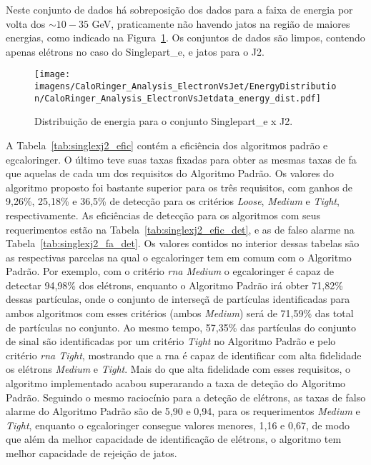 Neste conjunto de dados há sobreposição dos dados para a faixa de energia por
volta dos $\sim10-35$ GeV, praticamente não havendo jatos na região de maiores
energias, como indicado na Figura~\ref{fig:singlexj2_distenergia}. Os conjuntos de
dados são limpos, contendo apenas elétrons no caso do Singlepart\_e, e jatos
para o J2.

\begin{figure}[ht]
\centering
\texttt{[image: imagens/CaloRinger\_Analysis\_ElectronVsJet/EnergyDistribution/CaloRinger\_Analysis\_ElectronVsJetdata\_energy\_dist.pdf]}
\label{fig:singlexj2_distenergia}
\caption{Distribuição de energia para o conjunto Singlepart\_e x J2.}
\end{figure}

A Tabela~\ref{tab:singlexj2_efic} contém a eficiência dos algoritmos padrão e
\gls{egcaloringer}. O último teve suas taxas fixadas para obter as mesmas taxas
de \gls{fa} que aquelas de cada um dos requisitos do Algoritmo Padrão. Os
valores do algoritmo proposto foi bastante superior para os três requisitos, com
ganhos de 9,26\%, 25,18\% e 36,5\% de detecção para os critérios \emph{Loose},
\emph{Medium} e \emph{Tight}, respectivamente. As eficiências de
detecção para os algoritmos com seus requerimentos estão na
Tabela~\ref{tab:singlexj2_efic_det}, e as de falso alarme
na Tabela~\ref{tab:singlexj2_fa_det}. Os valores contidos no interior dessas
tabelas são as respectivas parcelas na qual o \gls{egcaloringer} tem em comum
com o Algoritmo Padrão. Por exemplo, com o critério \emph{\gls{rna} Medium} o
\gls{egcaloringer} é capaz de detectar 94,98\% dos elétrons, enquanto o
Algoritmo Padrão irá obter 71,82\% dessas partículas, onde o conjunto de
interseçã de partículas identificadas para ambos algoritmos com esses critérios
(ambos \emph{Medium}) será de 71,59\% das total de partículas no conjunto. Ao
mesmo tempo, 57,35\% das partículas do conjunto de sinal são identificadas por um critério
\emph{Tight} no Algoritmo Padrão e pelo critério \emph{\gls{rna} Tight},
mostrando que a \gls{rna} é capaz de identificar com alta fidelidade os elétrons
\emph{Medium} e \emph{Tight}. Mais do que alta fidelidade com esses requisitos,
o algoritmo implementado acabou superarando a taxa de deteção do Algoritmo
Padrão. Seguindo o mesmo raciocínio para a deteção de elétrons, as taxas de falso
alarme do Algoritmo Padrão são de 5,90 e 0,94, para os requerimentos \emph{Medium}
e \emph{Tight}, enquanto o \gls{egcaloringer} consegue valores menores, 1,16 e
0,67, de modo que além da melhor capacidade de identificação de elétrons, o
algoritmo tem melhor capacidade de rejeição de jatos.

